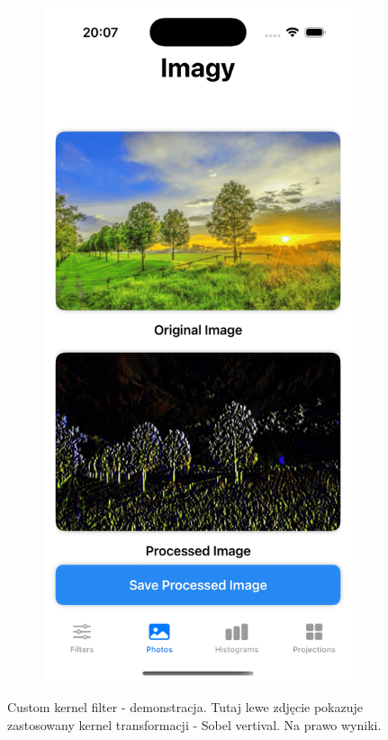 \documentclass[a4paper]{article}
\begin{document}
\begin{figure}[H]
\begin{subfigure}{0.2\textwidth}
        \label{fig:dog_custom_vertical}
    \end{subfigure}
    \hfill
    \begin{subfigure}{0.2\textwidth}
        \centering
        \includegraphics[width=\linewidth]{images/trees_custom_vertical.png}
        \label{fig:trees_custom_vertical}
    \end{subfigure}
    \caption{Custom kernel filter - demonstracja. Tutaj lewe zdjęcie pokazuje zastosowany kernel transformacji - Sobel vertival. Na prawo wyniki.}
    \label{fig:custom_vertical}
\end{figure}
\end{document}
